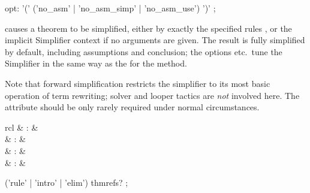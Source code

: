 \begin{isabellebody}
\begin{isamarkuptext}
\begin{rail}
    opt: '(' ('no\_asm' | 'no\_asm\_simp' | 'no\_asm\_use') ')'
    ;
  \end{rail}

  \begin{descr}
  
  \item [\hyperlink{attribute.simplified}{\mbox{\isa{simplified}}}~\isa{{\isachardoublequote}a\isactrlsub {\isadigit{1}}\ {\isasymdots}\ a\isactrlsub n{\isachardoublequote}}]
  causes a theorem to be simplified, either by exactly the specified
  rules , or the implicit Simplifier
  context if no arguments are given.  The result is fully simplified
  by default, including assumptions and conclusion; the options  etc.\ tune the Simplifier in the same way as the for the
   method.

  Note that forward simplification restricts the simplifier to its
  most basic operation of term rewriting; solver and looper tactics
  \cite{isabelle-ref} are \emph{not} involved here.  The  attribute should be only rarely required under normal
  circumstances.

  \end{descr}%
\end{isamarkuptext}%
\isamarkuptrue%
%
\isamarkuptrue%
%
\isamarkuptrue%
%
\begin{isamarkuptext}%
\begin{matharray}{rcl}
    \hypertarget{method.rule}{\hyperlink{method.rule}{\mbox{}}} & : & \isarmeth \\
    \hypertarget{method.contradiction}{\hyperlink{method.contradiction}{\mbox{}}} & : & \isarmeth \\
    \hypertarget{method.intro}{\hyperlink{method.intro}{\mbox{}}} & : & \isarmeth \\
    \hypertarget{method.elim}{\hyperlink{method.elim}{\mbox{}}} & : & \isarmeth \\
  \end{matharray}

  \begin{rail}
    ('rule' | 'intro' | 'elim') thmrefs?
    ;
  \end{rail}


\end{isamarkuptext}
\end{isabellebody}
